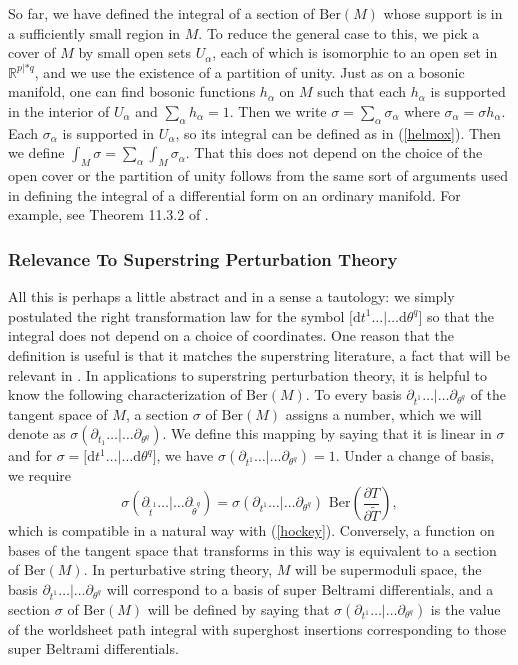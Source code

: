 \documentclass[11pt,a4paper]{article}
\def\t{{ \sf t}}
\def\tilde{\widetilde}
\def\d{{\mathrm d}}
\def\R{{\mathbb R}}
\def\[{\bigl [}
\def\]{\bigr ]}
\def\t{\tilde }
\def\tilde{\widetilde}
\def\Ber{{\mathrm {Ber}}}
\begin{document}
So far, we have defined the integral of a section of $\Ber(M)$ whose support is in a sufficiently small region in $M$.  To reduce the general case
to this, we pick a cover of $M$ by small open sets $U_\alpha$, each of which is isomorphic to an open set in $\R^{p|*q}$, and
we  use the existence of a partition of unity.  Just as on a bosonic manifold, one can find bosonic functions $h_\alpha$
on $M$ such that each $h_\alpha$ is supported in the interior of $U_\alpha$ and $\sum_\alpha h_\alpha=1$.   Then we write $\sigma=\sum_\alpha
\sigma_\alpha$ where $\sigma_\alpha =\sigma h_\alpha$.  Each $\sigma_\alpha$ is supported in $U_\alpha$, so its integral can be defined
as in (\ref{helmox}).  Then we define $\int_M\sigma=\sum_\alpha\int_M\sigma_\alpha$.  That this does not depend on the choice of the open cover
or the partition
of unity follows from the same sort of arguments used in defining the integral of a differential form on an ordinary manifold.  For example,
see Theorem 11.3.2 of \cite{Rogers}.

\subsubsection{Relevance To Superstring Perturbation Theory}\label{relevance}

All this is perhaps a little abstract and in a sense a tautology: we simply postulated the right transformation law for the symbol
$\[\d t^1\dots|\dots\d \theta^q\]$ so that the integral does not depend on a choice of coordinates.  One reason that the 
definition is useful is that it matches the superstring literature, a fact that will be relevant in \cite{reconsidered}.  In applications to superstring 
perturbation theory, it is  helpful
to know the following characterization of $\Ber(M)$.  To every basis $\partial_{t^1}\dots |\dots\partial_{\theta^q}$ of the tangent space
of $M$, a section $\sigma$ of $\Ber(M)$ assigns a number, which we will denote as $\sigma(\partial_{t_1}\dots|\dots\partial_{\theta^q})$.
We define this mapping by saying that it is linear in $\sigma$ and for $\sigma = [\d t^1\dots|\dots\d \theta^q\]$, we have
$\sigma(\partial_{t^1}\dots|\dots\partial_{\theta^q})=1$.  Under a change of basis, we require
\begin{equation}\label{zelb}\sigma(\partial_{\t t^1}\dots|\dots\partial_{\t \theta^q})= \sigma(\partial_{t^1}\dots|\dots\partial_{\theta^q})\,\,
\Ber\left(\frac{\partial T}{\partial\t  T}\right),\end{equation}
which is compatible in a natural way with  (\ref{hockey}).  Conversely, a function on bases of the tangent space that transforms in 
this way is equivalent to a section of $\Ber(M)$.  In 
perturbative string theory, $M$ will be supermoduli space, the basis $\partial_{t^1}\dots|\dots\partial_{\theta^q}$
will correspond to a basis of super Beltrami differentials, and a section $\sigma$ of $\Ber(M)$  will
be defined by saying that $\sigma(\partial_{t^1}\dots|\dots\partial_{\theta^q}) $ is the value of
the worldsheet path integral with superghost insertions corresponding to those super Beltrami differentials.  
\end{document}
